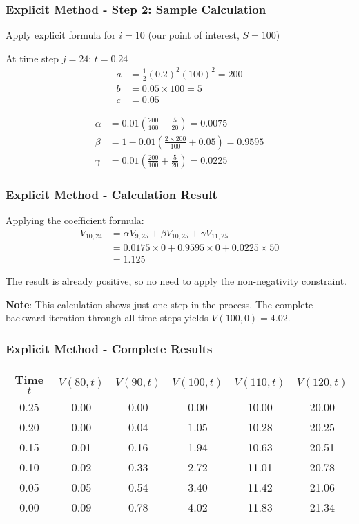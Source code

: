 \documentclass[aspectratio=169]{beamer}
\begin{document}
\begin{frame}
\frametitle{Explicit Method - Step 2: Sample Calculation}
Apply explicit formula for $i = 10$ (our point of interest, $S = 100$)

At time step $j = 24$: $t = 0.24$
\begin{align*}
a &= \frac{1}{2}(0.2)^2(100)^2 = 200 \\
b &= 0.05 \times 100 = 5 \\
c &= 0.05
\end{align*}
\end{frame}

\begin{frame}
\begin{align*}
\alpha &= 0.01 \left(\frac{200}{100} - \frac{5}{20}\right) = 0.0075 \\
\beta &= 1 - 0.01 \left(\frac{2 \times 200}{100} + 0.05\right) = 0.9595 \\
\gamma &= 0.01 \left(\frac{200}{100} + \frac{5}{20}\right) = 0.0225
\end{align*}
\end{frame}

\begin{frame}
\frametitle{Explicit Method - Calculation Result}
Applying the coefficient formula:
\begin{align}
V_{10,24} &= \alpha V_{9,25} + \beta V_{10,25} + \gamma V_{11,25} \\
&= 0.0175 \times 0 + 0.9595 \times 0 + 0.0225 \times 50 \\
&= 1.125
\end{align}

The result is already positive, so no need to apply the non-negativity constraint.

\textbf{Note}: This calculation shows just one step in the process. The complete backward iteration 
through all time steps yields $V(100,0) = 4.02$.
\end{frame}

\begin{frame}
\frametitle{Explicit Method - Complete Results}
\begin{center}
\begin{tabular}{c|c|c|c|c|c}
Time $t$ & $V(80,t)$ & $V(90,t)$ & $V(100,t)$ & $V(110,t)$ & $V(120,t)$ \\
\hline
0.25 & 0.00 & 0.00 & 0.00 & 10.00 & 20.00 \\
0.20 & 0.00 & 0.04 & 1.05 & 10.28 & 20.25 \\
0.15 & 0.01 & 0.16 & 1.94 & 10.63 & 20.51 \\
0.10 & 0.02 & 0.33 & 2.72 & 11.01 & 20.78 \\
0.05 & 0.05 & 0.54 & 3.40 & 11.42 & 21.06 \\
0.00 & 0.09 & 0.78 & 4.02 & 11.83 & 21.34 \\
\end{tabular}
\end{center}
\end{frame}
\end{document}
